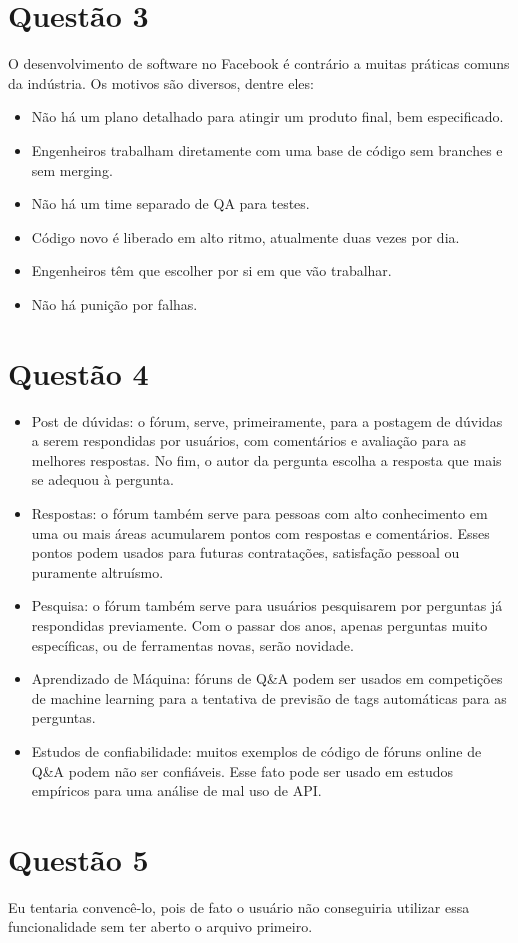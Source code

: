 \documentclass[11pt]{article}
\begin{document}
\section{Questão 3}
\label{sec:org8d34938}
O desenvolvimento de software no Facebook é contrário a muitas práticas comuns da
indústria. Os motivos são diversos, dentre eles:
\begin{itemize}
\item Não há um plano detalhado para atingir um produto final, bem especificado.
\item Engenheiros trabalham diretamente com uma base de código sem branches e sem merging.
\item Não há um time separado de QA para testes.
\item Código novo é liberado em alto ritmo, atualmente duas vezes por dia.
\item Engenheiros têm que escolher por si em que vão trabalhar.
\item Não há punição por falhas.
\end{itemize}

\section{Questão 4}
\label{sec:orgddd300a}
\begin{itemize}
\item Post de dúvidas: o fórum, serve, primeiramente, para a postagem de dúvidas a serem
respondidas por usuários, com comentários e avaliação para as melhores respostas. No
fim, o autor da pergunta escolha a resposta que mais se adequou à pergunta.
\item Respostas: o fórum também serve para pessoas com alto conhecimento em uma ou mais
áreas acumularem pontos com respostas e comentários. Esses pontos podem usados para
futuras contratações, satisfação pessoal ou puramente altruísmo.
\item Pesquisa: o fórum também serve para usuários pesquisarem por perguntas já respondidas
previamente. Com o passar dos anos, apenas perguntas muito específicas, ou de
ferramentas novas, serão novidade.
\item Aprendizado de Máquina: fóruns de Q\&A podem ser usados em competições de machine
learning para a tentativa de previsão de tags automáticas para as perguntas.
\item Estudos de confiabilidade: muitos exemplos de código de fóruns online de Q\&A podem não
ser confiáveis. Esse fato pode ser usado em estudos empíricos para uma análise de mal
uso de API.
\end{itemize}

\section{Questão 5}
\label{sec:orgcc34e0b}
Eu tentaria convencê-lo, pois de fato o usuário não conseguiria utilizar essa
funcionalidade sem ter aberto o arquivo primeiro.
\end{document}
